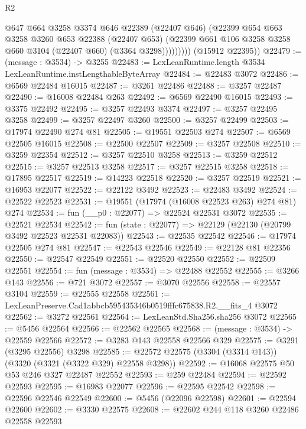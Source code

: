 \begin{lexlean}{R2}
\begin{coremodule}
                  @647
                  @664
                  @3258
                  @3374
                  @646
                  @22389
                  (@22407 @646)
                  (@22399
                    @654
                    @663
                    @3258
                    @3260
                    @653
                    @22388
                    (@22407 @653)
                    (@22399 @661 @106 @3258 @3258 @660 @3104 (@22407 @660) (@3364 @3298)))))))))
      (@15912 @22395))
@22479 := (message : @3534) -> @3255
@22483 := LexLeanRuntime.length @3534 LexLeanRuntime.instLengthableByteArray
@22484 := @22483 @3072
@22486 := @6569 @22484 @16015
@22487 := @3261 @22486
@22488 := @3257 @22487
@22490 := @16008 @22484 @263
@22492 := @6569 @22490 @16015
@22493 := @3375 @22492
@22495 := @3257 @22493 @3374
@22497 := @3257 @22495 @3258
@22499 := @3257 @22497 @3260
@22500 := @3257 @22499
@22503 := @17974 @22490 @274 @81
@22505 := @19551 @22503 @274
@22507 := @6569 @22505 @16015
@22508 := @22500 @22507
@22509 := @3257 @22508
@22510 := @3259 @22354
@22512 := @3257 @22510 @3258
@22513 := @3259 @22512
@22515 := @3257 @22513 @3258
@22517 := @3257 @22515 @3258
@22518 := @17895 @22517
@22519 := @14223 @22518
@22520 := @3257 @22519
@22521 := @16953 @22077
@22522 := @22122 @3492
@22523 := @22483 @3492
@22524 := @22522 @22523
@22531 := @19551 (@17974 (@16008 @22523 @263) @274 @81) @274
@22534 := fun (__p0 : @22077) => @22524 @22531 @3072
@22535 := @22521 @22534
@22542 := fun (state : @22077) => @22129 (@22130 (@20799 @3492 @22523 @22531 @22083))
@22543 := @22535 @22542
@22546 := @17974 @22505 @274 @81
@22547 := @22543 @22546
@22549 := @22128 @81 @22356
@22550 := @22547 @22549
@22551 := @22520 @22550
@22552 := @22509 @22551
@22554 := fun (message : @3534) => @22488 @22552
@22555 := @3266 @143
@22556 := @721 @3072
@22557 := @3070 @22556
@22558 := @22557 @3104
@22559 := @22555 @22558
@22561 := LexLeanPreserve.Cad1abbcb595435346b0519fffc675838.R2.__fits_4 @3072
@22562 := @3272 @22561
@22564 := LexLeanStd.Sha256.sha256 @3072
@22565 := @5456 @22564
@22566 := @22562 @22565
@22568 := (message : @3534) -> @22559 @22566
@22572 := @3283 @143 @22558 @22566 @329
@22575 := @3291 (@3295 @22556) @3298
@22585 := @22572 @22575 (@3304 (@3314 @143)) (@3320 (@3321 (@3322 @329) @22558 @3298))
@22592 := @16068 @22575 @50 @53 @246 @327 @22487 @22552
@22593 := @259 @22484
@22594 := @22592 @22593
@22595 := @16983 @22077
@22596 := @22595 @22542
@22598 := @22596 @22546 @22549
@22600 := @5456 (@22096 @22598)
@22601 := @22594 @22600
@22602 := @3330 @22575
@22608 := @22602 @244 @118 @3260 @22486 @22558 @22593

\end{coremodule}
\end{lexlean}
